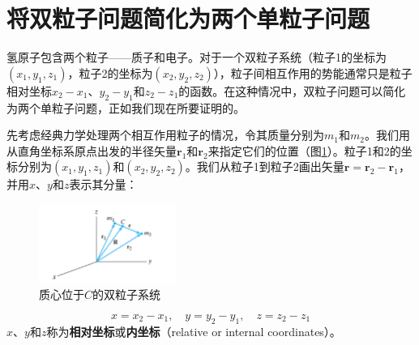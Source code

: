 \section{将双粒子问题简化为两个单粒子问题}
\label{sec:6.3 Reduction of the Two-Particle Problem to Two One-Particle Problems}
    氢原子包含两个粒子——质子和电子。对于一个双粒子系统（粒子1的坐标为$\left(x_1,y_1,z_1\right)$，粒子2的坐标为$\left(x_2,y_2,z_2\right)$），粒子间相互作用的势能通常只是粒子相对坐标$x_2-x_1$、$y_2-y_1$和$z_2-z_1$的函数。在这种情况中，双粒子问题可以简化为两个单粒子问题，正如我们现在所要证明的。

    先考虑经典力学处理两个相互作用粒子的情况，令其质量分别为$m_1$和$m_2$。我们用从直角坐标系原点出发的半径矢量$\mathbf{r}_1$和$\mathbf{r}_2$来指定它们的位置（图\ref{fig:6.1}）。粒子1和2的坐标分别为$\left(x_1,y_1,z_1\right)$和$\left(x_2,y_2,z_2\right)$。我们从粒子1到粒子2画出矢量$\mathbf{r} = \mathbf{r}_2 - \mathbf{r}_1$，并用$x$、$y$和$z$表示其分量：
    \begin{figure}[h!]
        \centering
        \includegraphics[width=0.4\textwidth]{Figures/6.1.png}
        \caption{质心位于$C$的双粒子系统}
        \label{fig:6.1}
    \end{figure}
    \begin{equation}
        \boxed{
            x = x_2 - x_1, \quad y = y_2 - y_1, \quad z = z_2 - z_1
        }
        \label{eq:6.28}
    \end{equation}
    $x$、$y$和$z$称为\textbf{相对坐标}或\textbf{内坐标}（relative or internal coordinates）。

